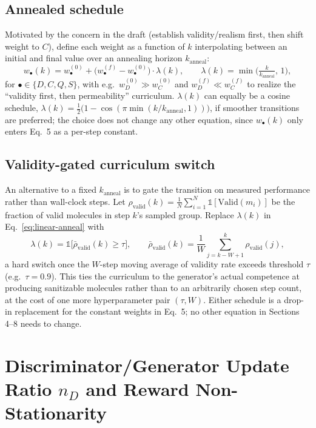 \documentclass[11pt]{article}
\newcommand{\1}{\mathbb{1}}
\begin{document}
\subsection{Annealed schedule}
Motivated by the concern in the draft (establish validity/realism
first, then shift weight to $C$), define each weight as a function of
$k$ interpolating between an initial and final value over an
annealing horizon $k_{\mathrm{anneal}}$:
\begin{equation}
w_\bullet(k) = w_\bullet^{(0)} + \big(w_\bullet^{(f)} - w_\bullet^{(0)}\big)\cdot
\lambda(k), \qquad
\lambda(k) = \min\!\Big(\tfrac{k}{k_{\mathrm{anneal}}},\, 1\Big),
\label{eq:linear-anneal}
\end{equation}
for $\bullet \in \{D, C, Q, S\}$, with e.g.\ $w_D^{(0)} \gg w_C^{(0)}$
and $w_D^{(f)} \ll w_C^{(f)}$ to realize the ``validity first, then
permeability'' curriculum. $\lambda(k)$ can equally be a cosine
schedule, $\lambda(k) = \tfrac12\big(1-\cos(\pi \min(k/k_{\mathrm{anneal}},1))\big)$,
if smoother transitions are preferred; the choice does not change any
other equation, since $w_\bullet(k)$ only enters Eq.~5 as a
per-step constant.

\subsection{Validity-gated curriculum switch}
An alternative to a fixed $k_{\mathrm{anneal}}$ is to gate the
transition on measured performance rather than wall-clock steps.
Let $\rho_{\mathrm{valid}}(k) = \frac{1}{N}\sum_{i=1}^N
\1[\mathrm{Valid}(m_i)]$ be the fraction of valid molecules in step
$k$'s sampled group. Replace $\lambda(k)$ in
Eq.~\eqref{eq:linear-anneal} with
\begin{equation}
\lambda(k) = \1\!\big[\bar\rho_{\mathrm{valid}}(k) \ge \tau\big],
\qquad
\bar\rho_{\mathrm{valid}}(k) = \frac{1}{W}\sum_{j=k-W+1}^{k} \rho_{\mathrm{valid}}(j),
\end{equation}
a hard switch once the $W$-step moving average of validity rate
exceeds threshold $\tau$ (e.g.\ $\tau = 0.9$). This ties the
curriculum to the generator's actual competence at producing
sanitizable molecules rather than to an arbitrarily chosen step
count, at the cost of one more hyperparameter pair $(\tau, W)$. Either
schedule is a drop-in replacement for the constant weights in Eq.~5;
no other equation in Sections 4--8 needs to change.

\section{Discriminator/Generator Update Ratio $n_D$ and Reward Non-Stationarity}
\label{sec:nD-nonstationarity}
\end{document}
